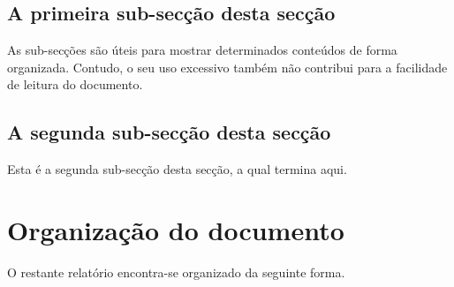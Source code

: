 %
%

\subsection{A primeira sub-secção desta secção} \label{sec121}
As sub-secções são úteis para mostrar determinados conteúdos de forma
organizada. Contudo, o seu uso excessivo também não contribui para a facilidade
de leitura do documento.

%
%

\subsection{A segunda sub-secção desta secção} \label{sec122}
Esta é a segunda sub-secção desta secção, a qual termina aqui.


%
%


\section{Organização do documento} \label{sec13}
O restante relatório encontra-se organizado da seguinte forma.
